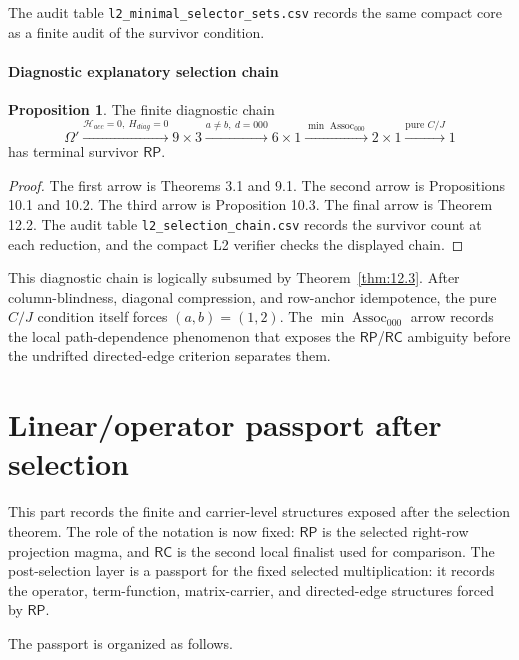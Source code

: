 \documentclass[11pt]{article}
\theoremstyle{definition}
\newtheorem{proposition}[theorem]{Proposition}
\newcommand{\RP}{\mathsf{RP}}
\newcommand{\RC}{\mathsf{RC}}
\begin{document}
The audit table \texttt{l2\_minimal\_selector\_sets.csv} records the
same compact core as a finite audit of the survivor condition.

\subsection{Diagnostic explanatory selection
chain}\label{full-explanatory-selection-chain}

\begin{proposition}
\label{prop:12.4}
The finite diagnostic chain
\[
\Omega'
\xrightarrow{\mathcal H_{acc}=0,
\ H_{diag}=0}
9\times3
\xrightarrow{a\ne b,
\ d=000}
6\times1
\xrightarrow{\min\operatorname{Assoc}_{000}}
2\times1
\xrightarrow{\text{pure }C/J}
1
\]
has terminal survivor \(\RP\).
\end{proposition}

\begin{proof}
The first arrow is Theorems 3.1 and 9.1. The second
arrow is Propositions 10.1 and 10.2. The third arrow is Proposition
10.3. The final arrow is Theorem 12.2. The audit table
\texttt{l2\_selection\_chain.csv} records the survivor count at each
reduction, and the compact L2 verifier checks the displayed chain.
\end{proof}

This diagnostic chain is logically subsumed by Theorem~\ref{thm:12.3}.
After column-blindness, diagonal compression, and row-anchor idempotence, the
pure \(C/J\) condition itself forces \((a,b)=(1,2)\).  The
\(\min\operatorname{Assoc}_{000}\) arrow records the local path-dependence
phenomenon that exposes the \(\RP\)/\(\RC\) ambiguity before the
undrifted directed-edge criterion separates them.


\part{Linear/operator passport after selection}

This part records the finite and carrier-level structures exposed after the
selection theorem.  The role of the notation is now fixed:
\(\RP\) is the selected right-row projection magma, and \(\RC\) is the
second local finalist used for comparison.  The post-selection layer is a passport for the fixed selected
multiplication: it records the operator, term-function, matrix-carrier,
and directed-edge structures forced by \(\RP\).

The passport is organized as follows.
\end{document}
